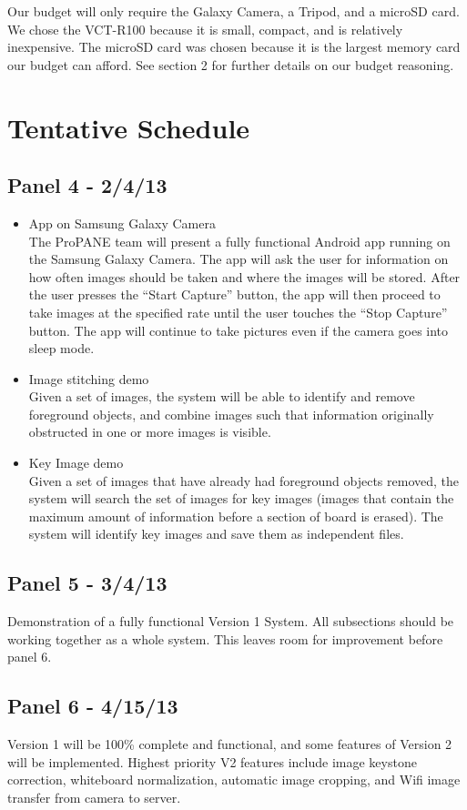 \documentclass[]{article}
\begin{document}
	Our budget will only require the Galaxy Camera, a Tripod, and a microSD card. We chose the VCT-R100 because it is small, compact, and is relatively inexpensive. The microSD card was chosen because it is the largest memory card our budget can afford. See section 2 for further details on our budget reasoning.
	
	\section{Tentative Schedule}
\subsection*{Panel 4 - 2/4/13}
\begin{itemize}
\item{App on Samsung Galaxy Camera} \\

The ProPANE team will present a fully functional Android app running on the Samsung Galaxy Camera.  The app will ask the user for information on how often images should be taken and where the images will be stored.  After the user presses the ``Start Capture'' button, the app will then proceed to take images at the specified rate until the user touches the ``Stop Capture'' button.  The app will continue to take pictures even if the camera goes into sleep mode.
\item{Image stitching demo} \\

Given a set of images, the system will be able to identify and remove foreground objects, and combine images such that information originally obstructed in one or more images is visible.
\item{Key Image demo} \\

Given a set of images that have already had foreground objects removed, the system will search the set of images for key images (images that contain the maximum amount of information before a section of board is erased).  The system will identify key images and save them as independent files.
\end{itemize}

\subsection*{Panel 5 - 3/4/13}
Demonstration of a fully functional Version 1 System.  All subsections should be working together as a whole system.  This leaves room for improvement before panel 6.

\subsection*{Panel 6 - 4/15/13}
Version 1 will be 100\% complete and functional, and some features of Version 2 will be implemented.  Highest priority V2 features include image keystone correction, whiteboard normalization, automatic image cropping, and Wifi image transfer from camera to server.	
			
\end{document}
